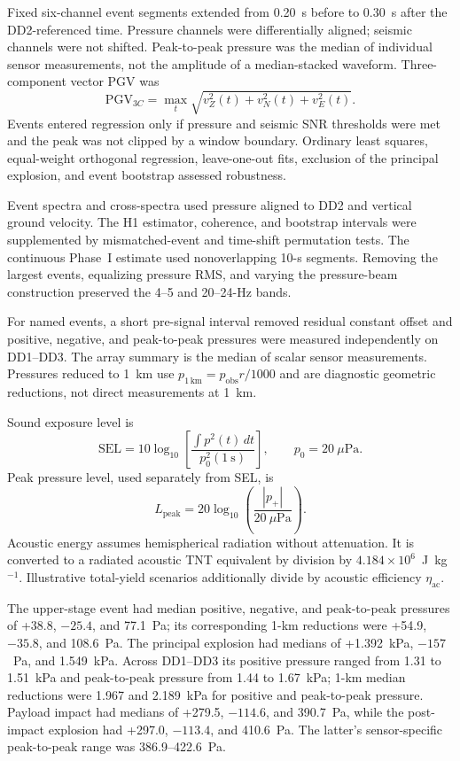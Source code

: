 \documentclass[]{seismica}
\begin{document}
Fixed six-channel event segments extended from 0.20~s before to 0.30~s after
the DD2-referenced time. Pressure channels were differentially aligned; seismic
channels were not shifted. Peak-to-peak pressure was the median of individual
sensor measurements, not the amplitude of a median-stacked waveform.
Three-component vector PGV was
\begin{equation}
 \mathrm{PGV}_{3C}=\max_t\sqrt{v_Z^2(t)+v_N^2(t)+v_E^2(t)}.
\end{equation}
Events entered regression only if pressure and seismic SNR thresholds were
met and the peak was not clipped by a window boundary. Ordinary least squares,
equal-weight orthogonal regression, leave-one-out fits, exclusion of the
principal explosion, and event bootstrap assessed robustness.

Event spectra and cross-spectra used pressure aligned to DD2 and vertical
ground velocity. The H1 estimator, coherence, and bootstrap intervals were
supplemented by mismatched-event and time-shift permutation tests. The
continuous Phase~I estimate used nonoverlapping 10-s segments. Removing the
largest events, equalizing pressure RMS, and varying the pressure-beam
construction preserved the 4--5 and 20--24-Hz bands.

For named events, a short pre-signal interval removed residual constant offset
and positive, negative, and peak-to-peak pressures were measured independently
on DD1--DD3. The array summary is the median of scalar sensor measurements.
Pressures reduced to 1~km use $p_{1\,\mathrm{km}}=p_{\mathrm{obs}}r/1000$ and
are diagnostic geometric reductions, not direct measurements at 1~km.

Sound exposure level is
\begin{equation}
 \mathrm{SEL}=10\log_{10}\left[
 \frac{\int p^2(t)\,dt}{p_0^2(1~\mathrm{s})}\right],
 \qquad p_0=20~\mu\mathrm{Pa}.
\end{equation}
Peak pressure level, used separately from SEL, is
\begin{equation}
 L_{\mathrm{peak}}=20\log_{10}\left(\frac{|p_+|}{20~\mu\mathrm{Pa}}\right).
\end{equation}
Acoustic energy assumes hemispherical radiation without attenuation. It is
converted to a radiated acoustic TNT equivalent by division by
$4.184\times10^6$~J~kg$^{-1}$. Illustrative total-yield scenarios additionally
divide by acoustic efficiency $\eta_{\mathrm{ac}}$.

The upper-stage event had median positive, negative, and peak-to-peak
pressures of +38.8, $-25.4$, and 77.1~Pa; its corresponding 1-km reductions
were +54.9, $-35.8$, and 108.6~Pa. The principal explosion had medians of
+1.392~kPa, $-157$~Pa, and 1.549~kPa. Across DD1--DD3 its positive pressure
ranged from 1.31 to 1.51~kPa and peak-to-peak pressure from 1.44 to 1.67~kPa;
1-km median reductions were 1.967 and 2.189~kPa for positive and peak-to-peak
pressure. Payload impact had medians of +279.5, $-114.6$, and 390.7~Pa, while
the post-impact explosion had +297.0, $-113.4$, and 410.6~Pa. The latter's
sensor-specific peak-to-peak range was 386.9--422.6~Pa.
\end{document}
